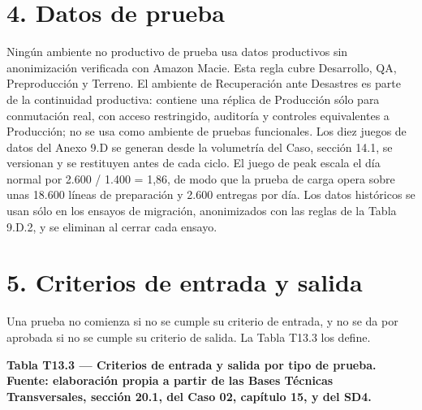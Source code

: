 \section*{4. Datos de prueba}

Ningún ambiente no productivo de prueba usa datos productivos sin anonimización verificada con Amazon Macie. Esta regla cubre Desarrollo, QA, Preproducción y Terreno. El ambiente de Recuperación ante Desastres es parte de la continuidad productiva: contiene una réplica de Producción sólo para conmutación real, con acceso restringido, auditoría y controles equivalentes a Producción; no se usa como ambiente de pruebas funcionales. Los diez juegos de datos del Anexo 9.D se generan desde la volumetría del Caso, sección 14.1, se versionan y se restituyen antes de cada ciclo. El juego de peak escala el día normal por 2.600 / 1.400 = 1,86, de modo que la prueba de carga opera sobre unas 18.600 líneas de preparación y 2.600 entregas por día. Los datos históricos se usan sólo en los ensayos de migración, anonimizados con las reglas de la Tabla 9.D.2, y se eliminan al cerrar cada ensayo.

\section*{5. Criterios de entrada y salida}

Una prueba no comienza si no se cumple su criterio de entrada, y no se da por aprobada si no se cumple su criterio de salida. La Tabla T13.3 los define.

\textbf{Tabla T13.3 — Criterios de entrada y salida por tipo de prueba. Fuente: elaboración propia a partir de las Bases Técnicas Transversales, sección 20.1, del Caso 02, capítulo 15, y del SD4.}

